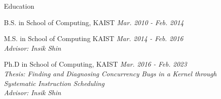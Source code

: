 
\begin{rSection}{Education}

B.S. in School of Computing, KAIST \hfill {\em Mar. 2010 - Feb. 2014}

M.S. in School of Computing KAIST \hfill {\em Mar. 2014 - Feb. 2016} \\
\textit{Advisor: Insik Shin}

Ph.D in School of Computing, KAIST \hfill {\em Mar. 2016 - Feb. 2023} \\
\textit{Thesis: Finding and Diagnosing Concurrency Bugs in a Kernel through Systematic Instruction Scheduling} \\
\textit{Advisor: Insik Shin}

\end{rSection}
